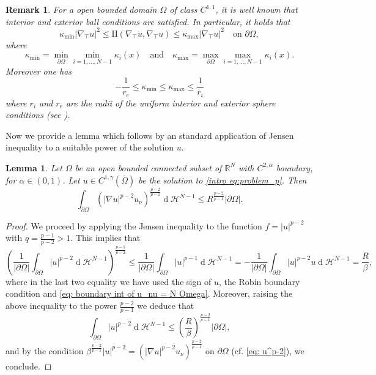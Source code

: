 \documentclass[10pt,a4paper]{amsart}
\numberwithin{equation}{section}
\newcommand{\R}{\mathbb{R}}
\newtheorem{rem}[teo]{Remark}
\newtheorem{lemma}[teo]{Lemma}
\renewcommand{\d}[1]{\ensuremath{\operatorname{d}\!{#1}}}
\begin{document}
    \begin{rem}\label{remark curvatures}
        For a open bounded domain $\Omega$ of class $C^{1,1}$, it is well known that interior and exterior ball conditions are satisfied. In particular, it holds that 
        \begin{equation*}
        \kappa_{\min} |\nabla_\top u|^2 \leq \mathrm{I\!I}(\nabla_\top u,\nabla_\top u) \leq \kappa_{\max} |\nabla_\top u|^2  \quad \text{on } \partial\Omega,
    \end{equation*}
    where
    \[
    \kappa_{\min} = \min_{\partial \Omega} \min_{i=1,\dots,N-1}  \kappa_i(x) \quad \text{and} \quad \kappa_{\max} = \max_{\partial \Omega} \max_{i=1,\dots,N-1}  \kappa_i(x).
    \]
    Moreover one has
    \[
    -\frac{1}{r_e} \leq  \kappa_{\min} \leq \kappa_{\max} \leq \frac{1}{r_i}
    \]
    where $r_i$ and $r_e$ are the radii of the uniform interior and exterior sphere conditions (see \cite[Rmk. 2.2]{mmp}).
    \end{rem}

    Now we provide a lemma which follows by an standard application of Jensen inequality to a suitable power of the solution $u$. 

    \begin{lemma}\label{lem:jensen ineq}
        Let $\Omega$ be an open bounded connected subset of $\R^N$ with $C^{2,\alpha}$ boundary, for $\alpha \in (0,1)$. Let $u \in C^{1,\gamma}(\overline{\Omega})$ be the solution to \eqref{intro eq:problem_p}. Then
        \begin{equation*}
            \int_{\partial\Omega} (|\nabla u|^{p-2} u_\nu)^{\frac{p-2}{p-1}} \d{}\mathcal{H}^{N-1} \leq R^{\frac{p-2}{p-1}} |\partial\Omega|.
        \end{equation*}
    \end{lemma}

    \begin{proof}
    We proceed by applying the Jensen inequality to the function $f= |u|^{p-2}$ with $q = \frac{p-1}{p-2} > 1$. This implies that
    \begin{equation*}
        \left(\frac{1}{|\partial\Omega|} \int_{\partial\Omega} |u|^{p-2} \d{}\mathcal{H}^{N-1}  \right)^{\frac{p-1}{p-2}} \leq \frac{1}{|\partial\Omega|} \int_{\partial\Omega} |u|^{p-1} \d{}\mathcal{H}^{N-1} = - \frac{1}{|\partial\Omega|} \int_{\partial\Omega} |u|^{p-2}u \d{}\mathcal{H}^{N-1} = \frac{R}{\beta},
    \end{equation*}
    where in the last two equality we have used the sign of $u$, the Robin boundary condition and \eqref{eq: boundary int of u_nu = N Omega}. Moreover, raising the above inequality to the power $\frac{p-2}{p-1}$ we deduce that 
    \[
    \int_{\partial\Omega} |u|^{p-2} \d{}\mathcal{H}^{N-1} \leq \left( \frac{R}{\beta}\right)^{\frac{p-2}{p-1}} |\partial\Omega|,
    \]
    and by the condition $\beta^{\frac{p-2}{p-1}} |u|^{p-2} = (|\nabla u|^{p-2} u_\nu)^{\frac{p-2}{p-1}}$ on $\partial\Omega$ (cf. \eqref{eq: u^p-2}), we conclude. 
    \end{proof}
\end{document}

